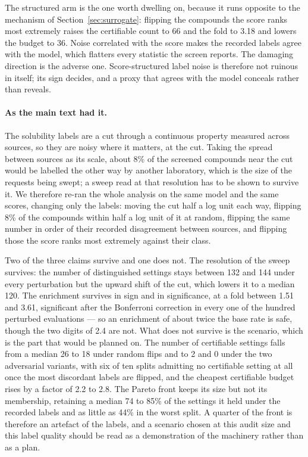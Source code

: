 \documentclass[10pt]{article}
\begin{document}
The structured arm is the one worth dwelling on, because it runs opposite to the mechanism of
Section~\ref{sec:surrogate}: flipping the compounds the score ranks most extremely raises the
certifiable count to 66 and the fold to 3.18 and lowers the budget to 36. Noise correlated
with the score makes the recorded labels agree with the model, which flatters every statistic
the screen reports. The damaging direction is the adverse one. Score-structured label noise
is therefore not ruinous in itself; its sign decides, and a proxy that agrees with the model
conceals rather than reveals.

\paragraph{As the main text had it.}
 The solubility labels are a cut through a continuous property measured across sources, so they are noisy where it matters, at the cut. Taking the spread between sources as its scale, about 8\% of the screened compounds near the cut would be labelled the other way by another laboratory, which is the size of the requests being swept; a sweep read at that resolution has to be shown to survive it. We therefore re-ran the whole analysis on the same model and the same scores, changing only the labels: moving the cut half a log unit each way, flipping 8\% of the compounds within half a log unit of it at random, flipping the same number in order of their recorded disagreement between sources, and flipping those the score ranks most extremely against their class.

Two of the three claims survive and one does not. The resolution of the sweep survives: the number of distinguished settings stays between 132 and 144 under every perturbation but the upward shift of the cut, which lowers it to a median 120. The enrichment survives in sign and in significance, at a fold between 1.51 and 3.61, significant after the Bonferroni correction in every one of the hundred perturbed evaluations --- so an enrichment of about twice the base rate is safe, though the two digits of 2.4 are not. What does not survive is the scenario, which is the part that would be planned on. The number of certifiable settings falls from a median 26 to 18 under random flips and to 2 and 0 under the two adversarial variants, with six of ten splits admitting no certifiable setting at all once the most discordant labels are flipped, and the cheapest certifiable budget rises by a factor of 2.2 to 2.8. The Pareto front keeps its size but not its membership, retaining a median 74 to 85\% of the settings it held under the recorded labels and as little as 44\% in the worst split. A quarter of the front is therefore an artefact of the labels, and a scenario chosen at this audit size and this label quality should be read as a demonstration of the machinery rather than as a plan.
\end{document}

